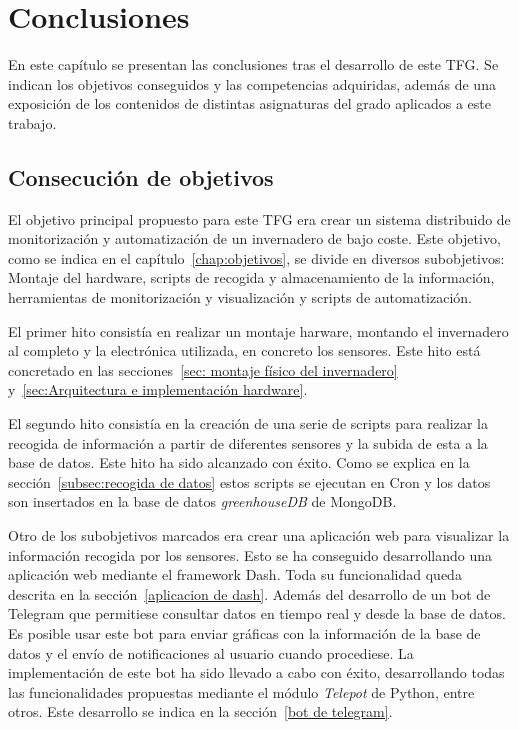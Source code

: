 \documentclass[a4paper, 12pt, oneside]{book}
\begin{document}

\cleardoublepage
\chapter{Conclusiones}
\label{chap:conclusiones}
En este capítulo se presentan las conclusiones tras el desarrollo de este TFG. Se indican los objetivos conseguidos y las competencias adquiridas, además de una exposición de los contenidos de distintas asignaturas del grado aplicados a este trabajo.

\section{Consecución de objetivos}
\label{sec:consecución de objetivos}
El objetivo principal propuesto para este TFG era crear un sistema distribuido de monitorización y automatización de un invernadero de bajo coste. Este objetivo, como se indica en el capítulo~\ref{chap:objetivos}, se divide en diversos subobjetivos: Montaje del hardware, scripts de recogida y almacenamiento de la información, herramientas de monitorización y visualización y scripts de automatización.

El primer hito consistía en realizar un montaje harware, montando el invernadero al completo y la electrónica utilizada, en concreto los sensores. Este hito está concretado en las secciones~\ref{sec: montaje físico del invernadero} y~\ref{sec:Arquitectura e implementación hardware}.

El segundo hito consistía en la creación de una serie de scripts para realizar la recogida de información a partir de diferentes sensores y la subida de esta a la base de datos. Este hito ha sido alcanzado con éxito. Como se explica en la sección~\ref{subsec:recogida de datos} estos scripts se ejecutan en Cron y los datos son insertados en la base de datos \textit{greenhouseDB} de MongoDB.

Otro de los subobjetivos marcados era crear una aplicación web para visualizar la información recogida por los sensores. Esto se ha conseguido desarrollando una aplicación web mediante el framework Dash. Toda su funcionalidad queda descrita en la sección~\ref{aplicacion de dash}.
Además del desarrollo de un bot de Telegram que permitiese consultar datos en tiempo real y desde la base de datos. Es posible usar este bot para enviar gráficas con la información de la base de datos y el envío de notificaciones al usuario cuando procediese. La implementación de este bot ha sido llevado a cabo con éxito, desarrollando todas las funcionalidades propuestas mediante el módulo \textit{Telepot} de Python, entre otros. Este desarrollo se indica en la sección~\ref{bot de telegram}.
\end{document}
